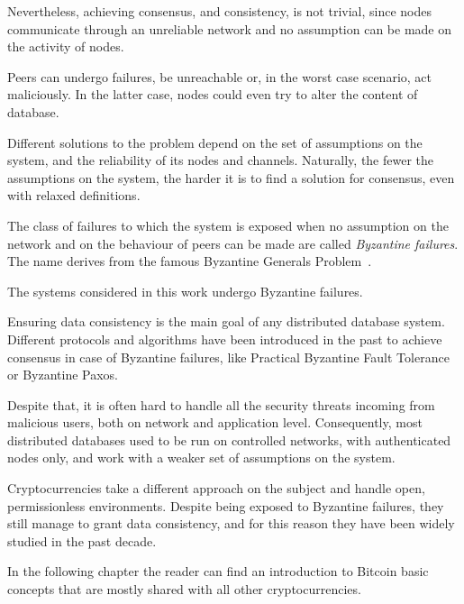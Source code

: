 Nevertheless, achieving consensus, and consistency, is not trivial, since nodes communicate through an unreliable network and no assumption can be made on the activity of nodes.

Peers can undergo failures, be unreachable or, in the worst case scenario, act maliciously. In the latter case, nodes could even try to alter the content of database.

Different solutions to the problem depend on the set of assumptions on the system, and the reliability of its nodes and channels. Naturally, the fewer the assumptions on the system, the harder it is to find a solution for consensus, even with relaxed definitions.

The class of failures to which the system is exposed when no assumption on the network and on the behaviour of peers can be made are called \emph{Byzantine failures}. The name derives from the famous Byzantine Generals Problem~\cite{bgp}.

The systems considered in this work undergo Byzantine failures.

Ensuring data consistency is the main goal of any distributed database system. Different protocols and algorithms have been introduced in the past to achieve consensus in case of Byzantine failures, like Practical Byzantine Fault Tolerance or Byzantine Paxos.

Despite that, it is often hard to handle all the security threats incoming from malicious users, both on network and application level. Consequently, most distributed databases used to be run on controlled networks, with authenticated nodes only, and work with a weaker set of assumptions on the system.

Cryptocurrencies take a different approach on the subject and handle open, permissionless environments. Despite being exposed to Byzantine failures, they still manage to grant data consistency, and for this reason they have been widely studied in the past decade.

In the following chapter the reader can find an introduction to Bitcoin basic concepts that are mostly shared with all other cryptocurrencies.

